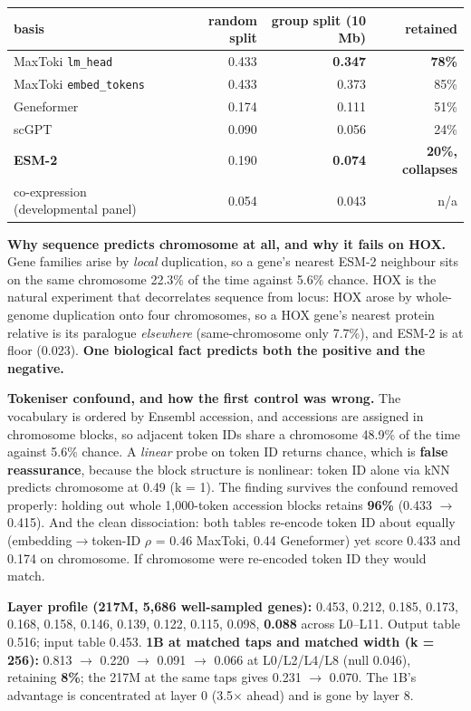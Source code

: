 \begin{longtable}[]{@{}lrrr@{}}
\toprule\noalign{}
basis & random split & \textbf{group split (10 Mb)} & retained \\
\midrule\noalign{}
\endhead
\bottomrule\noalign{}
\endlastfoot
MaxToki \texttt{lm\_head} & 0.433 & \textbf{0.347} & \textbf{78\%} \\
MaxToki \texttt{embed\_tokens} & 0.433 & 0.373 & 85\% \\
Geneformer & 0.174 & 0.111 & 51\% \\
scGPT & 0.090 & 0.056 & 24\% \\
\textbf{ESM-2} & 0.190 & \textbf{0.074} & \textbf{20\%, collapses} \\
co-expression (developmental panel) & 0.054 & 0.043 & n/a \\
\end{longtable}

\textbf{Why sequence predicts chromosome at all, and why it fails on HOX.} Gene families arise by \emph{local}
duplication, so a gene's nearest ESM-2 neighbour sits on the same chromosome 22.3\% of the time against
5.6\% chance. HOX is the natural experiment that decorrelates sequence from locus: HOX arose by
whole-genome duplication onto four chromosomes, so a HOX gene's nearest protein relative is its
paralogue \emph{elsewhere} (same-chromosome only 7.7\%), and ESM-2 is at floor (0.023). \textbf{One biological
fact predicts both the positive and the negative.}

\textbf{Tokeniser confound, and how the first control was wrong.} The vocabulary is ordered by Ensembl
accession, and accessions are assigned in chromosome blocks, so adjacent token IDs share a chromosome
48.9\% of the time against 5.6\% chance. A \emph{linear} probe on token ID returns chance, which is \textbf{false
reassurance}, because the block structure is nonlinear: token ID alone via kNN predicts chromosome at
0.49 (k = 1). The finding survives the confound removed properly: holding out whole 1,000-token
accession blocks retains \textbf{96\%} (0.433 \(\rightarrow\) 0.415). And the clean dissociation: both tables re-encode
token ID about equally (embedding\(\rightarrow\)token-ID \(\rho\) = 0.46 MaxToki, 0.44 Geneformer) yet score 0.433 and
0.174 on chromosome. If chromosome were re-encoded token ID they would match.

\textbf{Layer profile (217M, 5,686 well-sampled genes):} 0.453, 0.212, 0.185, 0.173, 0.168, 0.158, 0.146,
0.139, 0.122, 0.115, 0.098, \textbf{0.088} across L0--L11. Output table 0.516; input table 0.453. \textbf{1B at
matched taps and matched width (k = 256):} 0.813 \(\rightarrow\) 0.220 \(\rightarrow\) 0.091 \(\rightarrow\) 0.066 at L0/L2/L4/L8 (null 0.046),
retaining \textbf{8\%}; the 217M at the same taps gives 0.231 \(\rightarrow\) 0.070. The 1B's advantage is concentrated at
layer 0 (3.5\(\times\) ahead) and is gone by layer 8.


